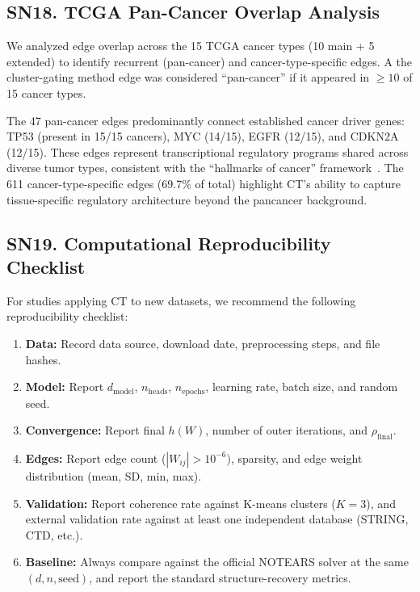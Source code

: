 \documentclass[12pt,a4paper]{article}
\begin{document}
\subsection*{SN18. TCGA Pan-Cancer Overlap Analysis}

We analyzed edge overlap across the 15 TCGA cancer types (10 main + 5 extended) to identify recurrent (pan-cancer) and cancer-type-specific edges. A the cluster-gating method edge was considered ``pan-cancer'' if it appeared in $\ge 10$ of 15 cancer types.

The 47 pan-cancer edges predominantly connect established cancer driver genes: TP53 (present in 15/15 cancers), MYC (14/15), EGFR (12/15), and CDKN2A (12/15). These edges represent transcriptional regulatory programs shared across diverse tumor types, consistent with the ``hallmarks of cancer'' framework~\cite{hanahan2011hallmarks}. The 611 cancer-type-specific edges (69.7\% of total) highlight CT's ability to capture tissue-specific regulatory architecture beyond the pancancer background.

\subsection*{SN19. Computational Reproducibility Checklist}

For studies applying CT to new datasets, we recommend the following reproducibility checklist:

\begin{enumerate}[leftmargin=*,itemsep=2pt]
    \item \textbf{Data:} Record data source, download date, preprocessing steps, and file hashes.
    \item \textbf{Model:} Report $d_{\text{model}}$, $n_{\text{heads}}$, $n_{\text{epochs}}$, learning rate, batch size, and random seed.
    \item \textbf{Convergence:} Report final $h(W)$, number of outer iterations, and $\rho_{\text{final}}$.
    \item \textbf{Edges:} Report edge count ($|W_{ij}| > 10^{-6}$), sparsity, and edge weight distribution (mean, SD, min, max).
    \item \textbf{Validation:} Report coherence rate against K-means clusters ($K=3$), and external validation rate against at least one independent database (STRING, CTD, etc.).
    \item \textbf{Baseline:} Always compare against the official NOTEARS solver at the same $(d,n,\text{seed})$, and report the standard structure-recovery metrics.
\end{enumerate}
\end{document}
